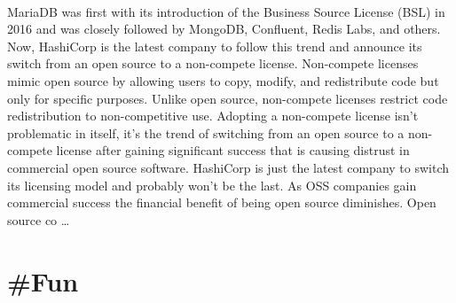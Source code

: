 \documentclass[10pt,a4paper]{article}
\begin{document}
\begin{multicols}{2}
\paragraph{}
 MariaDB was first with its introduction of the Business Source License (BSL) in 2016 and was closely followed by MongoDB, Confluent, Redis Labs, and others. Now, HashiCorp is the latest company to follow this trend and announce its switch from an open source to a non-compete license.
Non-compete licenses mimic open source by allowing users to copy, modify, and redistribute code but only for specific purposes. Unlike open source, non-compete licenses restrict code redistribution to non-competitive use. Adopting a non-compete license isn’t problematic in itself, it’s the trend of switching from an open source to a non-compete license after gaining significant success that is causing distrust in commercial open source software.
HashiCorp is just the latest company to switch its licensing model and probably won’t be the last. As OSS companies gain commercial success the financial benefit of being open source diminishes. Open source co
\dots\par
\end{multicols}

\newpage
\section{\#Fun}
\end{document}
